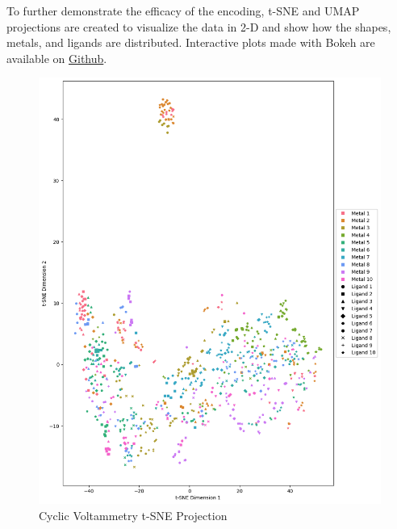 To further demonstrate the efficacy of the encoding, t-SNE and UMAP projections are created to visualize the data in 2-D and show how the shapes, metals, and ligands are distributed. Interactive plots made with Bokeh are available on \href{https://github.com/raineyfu/Thesis}{Github}.
\begin{figure}[h!]
  \centering
    \includegraphics[width=1.0\textwidth]{figures/cv_tsne.png}
    \caption{Cyclic Voltammetry t-SNE Projection}
    \label{cv-tsne}
\end{figure}
